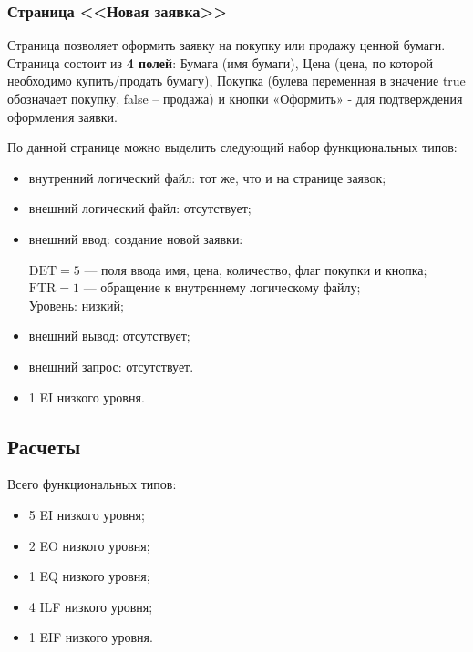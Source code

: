 \subsubsection{Страница <<Новая заявка>>}

Страница позволяет оформить заявку на покупку или продажу ценной бумаги. Страница состоит из \textbf{4 полей}: Бумага (имя бумаги), Цена (цена, по которой необходимо купить/продать бумагу), Покупка (булева переменная в значение true обозначает покупку, false – продажа) и кнопки «Оформить» - для подтверждения оформления заявки.

По данной странице можно выделить следующий набор функциональных типов:

\begin{itemize}
    \item внутренний логический файл: тот же, что и на странице заявок;
    \item внешний логический файл: отсутствует;
    \item внешний ввод: создание новой заявки:

        $\text{DET} = 5$ --- поля ввода имя, цена, количество, флаг покупки и кнопка; \\
        $\text{FTR} = 1$ --- обращение к внутреннему логическому файлу;\\
        Уровень: низкий;
    
    \item внешний вывод: отсутствует;
    \item внешний запрос: отсутствует.
\end{itemize}

\begin{itemize}
    \item 1 EI низкого уровня.
\end{itemize}

\subsection{Расчеты}

Всего функциональных типов:

\begin{itemize}
    \item 5 EI низкого уровня;
    \item 2 EO низкого уровня;
    \item 1 EQ низкого уровня;
    \item 4 ILF низкого уровня;
    \item 1 EIF низкого уровня.
\end{itemize}


